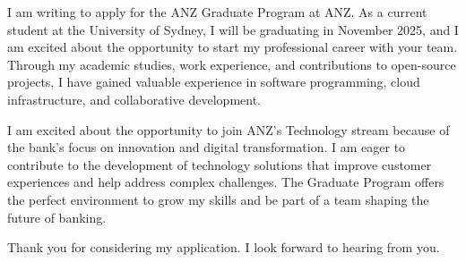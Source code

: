 \documentclass[11pt, a4paper]{awesome-cv}
\begin{document}
\makecvheader[R]

\makecvfooter
  {}
  {}
  {}

\makelettertitle

\begin{cvletter}

I am writing to apply for the ANZ Graduate Program at ANZ.
As a current student at the University of Sydney, I will be graduating in November 2025, and I am excited about the opportunity to start my professional career with your team.
Through my academic studies, work experience, and contributions to open-source projects, I have gained valuable experience in software programming, cloud infrastructure, and collaborative development.

I am excited about the opportunity to join ANZ's Technology stream because of the bank's focus on innovation and digital transformation.
I am eager to contribute to the development of technology solutions that improve customer experiences and help address complex challenges.
The Graduate Program offers the perfect environment to grow my skills and be part of a team shaping the future of banking.

Thank you for considering my application.
I look forward to hearing from you.

\end{cvletter}


\makeletterclosing
\end{document}
